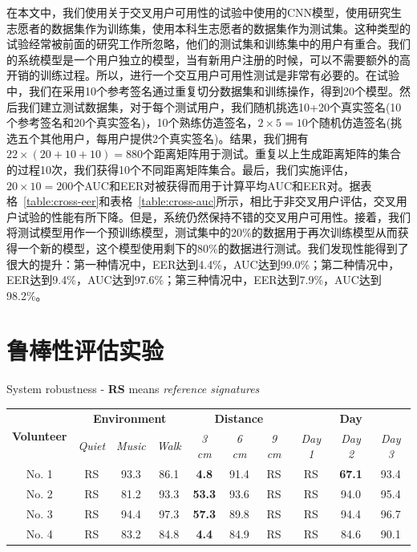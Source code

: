 在本文中，我们使用关于交叉用户可用性的试验中使用的CNN模型，使用研究生志愿者的数据集作为训练集，使用本科生志愿者的数据集作为测试集。这种类型的试验经常被前面的研究工作所忽略，他们的测试集和训练集中的用户有重合。我们的系统模型是一个用户独立的模型，当有新用户注册的时候，可以不需要额外的高开销的训练过程。所以，进行一个交互用户可用性测试是非常有必要的。在试验中，我们在采用10个参考签名通过重复切分数据集和训练操作，得到20个模型。然后我们建立测试数据集，对于每个测试用户，我们随机挑选10+20个真实签名(10个参考签名和20个真实签名)，10个熟练仿造签名，$2\times 5=10$个随机仿造签名(挑选五个其他用户，每用户提供2个真实签名)。结果，我们拥有$22\times (20+10+10)=880$个距离矩阵用于测试。重复以上生成距离矩阵的集合的过程10次，我们获得10个不同距离矩阵集合。最后，我们实施评估，$20\times 10=200$个AUC和EER对被获得而用于计算平均AUC和EER对。据表格~\ref{table:cross-eer}和表格~\ref{table:cross-auc}所示，相比于非交叉用户评估，交叉用户试验的性能有所下降。但是，系统仍然保持不错的交叉用户可用性。接着，我们将测试模型用作一个预训练模型，测试集中的20\%的数据用于再次训练模型从而获得一个新的模型，这个模型使用剩下的80\%的数据进行测试。我们发现性能得到了很大的提升：第一种情况中，EER达到4.4\%，AUC达到99.0\%；第二种情况中，EER达到9.4\%，AUC达到97.6\%；第三种情况中，EER达到7.9\%，AUC达到98.2\%。

\section{鲁棒性评估实验}
\label{sec:robustness-experiment}
\begin{table}[ht]
  \centering
  {System robustness - \textbf{RS} means \textit{reference signatures}}
  \label{table:system-robustness}
  \begin{tabular}{|c|ccc|ccc|ccc|}
    \hline
    \multirow{2}{*}{\textbf{Volunteer}} & \multicolumn{3}{|c|}{\textbf{Environment}} & \multicolumn{3}{|c|}{\textbf{Distance}} & \multicolumn{3}{|c|}{\textbf{Day}} \\
    \cline{2-10}
     & \textit{Quiet} & \textit{Music} & \textit{Walk} & \textit{3 cm} &  \textit{6 cm} & \textit{9 cm} & \textit{Day 1} & \textit{Day 2} & \textit{Day 3}\\
    \hline
    No. 1 & RS   & 93.3 & 86.1  & \textbf{4.8} & 91.4 & RS &  RS & \textbf{67.1} & 93.4  \\  
    \hline
    No. 2 & RS & 81.2 & 93.3  & \textbf{53.3} & 93.6 & RS & RS & 94.0 & 95.4 \\
    \hline
    No. 3 & RS & 94.4 & 97.3  & \textbf{57.3} & 89.8 & RS & RS &  94.4 & 96.7 \\
    \hline
    No. 4 & RS & 83.2 & 84.8  & \textbf{4.4} & 84.9 & RS & RS &  84.6 & 90.1 \\
    \hline 
  \end{tabular}
\end{table}

